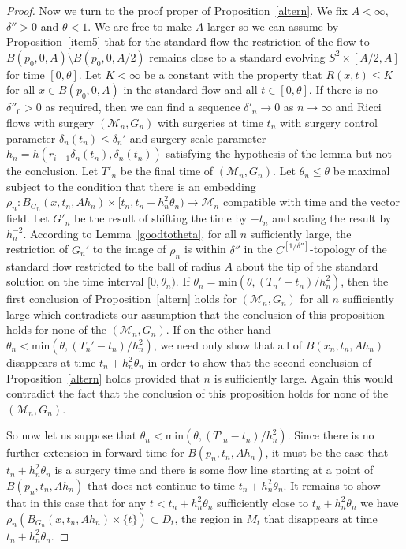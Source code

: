 \begin{proof}
Now we turn to the proof proper of Proposition~\ref{altern}. We fix
$A<\infty$, $\delta''>0$ and $\theta<1$. We are free to make $A$
larger so we can assume by Proposition~\ref{item5} that for the
standard flow the restriction of the flow to $B(p_0,0,A)\setminus
B(p_0,0,A/2)$ remains close to a standard evolving $S^2\times
[A/2,A]$ for time $[0,\theta]$. Let $K<\infty$ be a constant with
the property that $R(x,t)\le K$ for all $x\in B(p_0,0,A)$ in the
standard flow and all $t\in [0,\theta]$. If there is no
$\delta''_0>0$ as required, then we can find a sequence
$\delta'_n\rightarrow 0$ as $n\rightarrow\infty$ and Ricci flows with
surgery $({\mathcal M}_n,G_n)$ with surgeries at time $t_n$ with
surgery control parameter $\delta_n(t_n)\le \delta_n'$  and surgery
scale parameter $ h_n=h(r_{i+1}\delta_n( t_n),\delta_n(t_n))$
satisfying the hypothesis of the lemma but not the conclusion. Let
$T'_n$ be the final time of $({\mathcal M}_n,G_n)$. Let $\theta_n\le
\theta$ be maximal subject to the condition that there is an
embedding $\rho_n\colon B_{G_n}(x, t_n,Ah_n)\times [ t_n,
t_n+h_n^2\theta_n)\to {\mathcal M}_n$ compatible with time and the
vector field. Let $G'_n$ be the result of shifting the time by
$-t_n$ and scaling the result by $h_n^{-2}$. According to
Lemma~\ref{goodtotheta}, for all $n$ sufficiently large, the
restriction of $G_n'$ to the image of $\rho_n$ is within $\delta''$
in the $C^{[1/\delta'']}$-topology of the standard flow restricted
to the ball of radius $A$ about the tip of the standard solution on
the time interval $[0,\theta_n)$. If $\theta_n=\mathrm{min}(\theta,(T_n'-t_n)/h_n^2)$, then the first conclusion of
Proposition~\ref{altern} holds for $({\mathcal M}_n,G_n)$ for all
$n$ sufficiently large which contradicts our assumption that the
conclusion of this proposition holds for none of the $({\mathcal
M}_n,G_n)$. If on the other hand $\theta_n<\mathrm{min}(\theta,(T_n'-t_n)/h_n^2)$, we need only show that all of
$B(x_n,t_n,Ah_n)$ disappears at time $t_n+h_n^2\theta_n$ in order to
show that the second conclusion of Proposition~\ref{altern} holds
provided that $n$ is sufficiently large. Again this would contradict
the fact that the conclusion of this proposition holds for none of
the $({\mathcal M}_n,G_n)$.

So now let us suppose that $\theta_n<\mathrm{min}(\theta,(T'_n-t_n)/h_n^2)$. Since there is no further extension
in forward time for $B(p_n,t_n,A h_n)$, it must be the case that $
t_n+ h_n^2\theta_n$ is a surgery time and there is some flow line
starting at a  point of $B(p_n,t_n,A h_n)$ that does not continue to
time $t_n+h_n^2\theta_n$. It remains to show that in this case that
for any $t< t_n+ h_n^2\theta_n$ sufficiently close to $t_n+
h_n^2\theta_n$ we have $\rho_n\left(B_{G_n}(x, t_n,Ah_n)\times
\{t\}\right)\subset D_t$, the region in $M_t$ that disappears at
time $t_n+h_n^2\theta_n$.



\end{proof}
